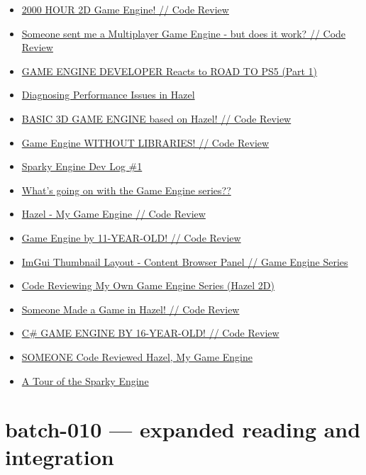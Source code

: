 \begin{itemize}
\item
  \href{https://www.youtube.com/watch?v=5b95WTHZ9HE}{2000 HOUR 2D Game Engine! // Code Review}
\item
  \href{https://www.youtube.com/watch?v=lAXOmE481j4}{Someone sent me a Multiplayer Game Engine - but does it work? // Code Review}
\item
  \href{https://www.youtube.com/watch?v=erxUR9SI4F0}{GAME ENGINE DEVELOPER Reacts to ROAD TO PS5 (Part 1)}
\item
  \href{https://www.youtube.com/watch?v=iY6QbL_3L2I}{Diagnosing Performance Issues in Hazel}
\item
  \href{https://www.youtube.com/watch?v=sIAXLH7ZqCw}{BASIC 3D GAME ENGINE based on Hazel! // Code Review}
\item
  \href{https://www.youtube.com/watch?v=v_BmwKl9Inc}{Game Engine WITHOUT LIBRARIES! // Code Review}
\item
  \href{https://www.youtube.com/watch?v=dXAIiCUrSv4}{Sparky Engine Dev Log \#1}
\item
  \href{https://www.youtube.com/watch?v=lwDdMYzUnxs}{What's going on with the Game Engine series??}
\item
  \href{https://www.youtube.com/watch?v=1W1FtRaY69Y}{Hazel - My Game Engine // Code Review}
\item
  \href{https://www.youtube.com/watch?v=dBlQv5GEBDc}{Game Engine by 11-YEAR-OLD! // Code Review}
\item
  \href{https://www.youtube.com/watch?v=uQljBVVb-lU}{ImGui Thumbnail Layout - Content Browser Panel // Game Engine Series}
\item
  \href{https://www.youtube.com/watch?v=aWGVjFTbXc8}{Code Reviewing My Own Game Engine Series (Hazel 2D)}
\item
  \href{https://www.youtube.com/watch?v=WOnMkazhP5I}{Someone Made a Game in Hazel! // Code Review}
\item
  \href{https://www.youtube.com/watch?v=kQc2BUjORhs}{C\# GAME ENGINE BY 16-YEAR-OLD! // Code Review}
\item
  \href{https://www.youtube.com/watch?v=Glq1oDBy1cQ}{SOMEONE Code Reviewed Hazel, My Game Engine}
\item
  \href{https://www.youtube.com/watch?v=32PRB7Tebbo}{A Tour of the Sparky Engine}
\end{itemize}

\section{batch-010 --- expanded reading and integration}\label{appendix-877738f6f4d2-batch-010-expanded-reading-and-integration}

